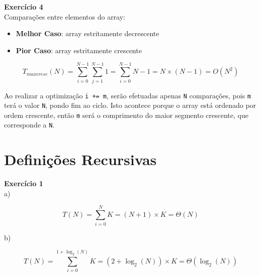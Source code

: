 \documentclass[a4paper,11pt]{article}
\begin{document}
	
	\noindent \textbf{Exercício 4}\\
	
	\noindent Comparações entre elementos do array:
	
	\begin{itemize}
		\item \textbf{Melhor Caso}: array estritamente decrescente
		\item \textbf{Pior Caso}: array estritamente crescente
	\end{itemize}
	\[
		T_{maxcresc}(N) = \sum_{i=0}^{N-1} \sum_{j=1}^{N-1} 1 = \sum_{i=0}^{N-1} N - 1 = N \times (N-1) = O(N^2)
	\]
	
	\noindent Ao realizar a optimização \texttt{i += m}, serão efetuadas apenas \texttt{N} comparações, pois \texttt{m} terá o valor \texttt{N}, pondo fim ao ciclo. Isto acontece porque o array está ordenado por ordem crescente, então \texttt{m} será o comprimento do maior segmento crescente, que corresponde a \texttt{N}.
	
	
	\section{Definições Recursivas}
	
	\noindent \textbf{Exercício 1}\\
	
	\noindent a)
	
	\begin{figure}[h]
		\centering
	\end{figure}
	\[
		T(N) = \sum_{i=0}^{N} K = (N + 1) \times K = \Theta(N)
	\]
	
	\noindent b)
	
	\begin{figure}[h]
		\centering
	\end{figure}
	\[
		T(N) = \sum_{i=0}^{1 + \log_2(N)} K = (2 + \log_2(N)) \times K = \Theta(\log_2(N))
	\]
	
\end{document}
